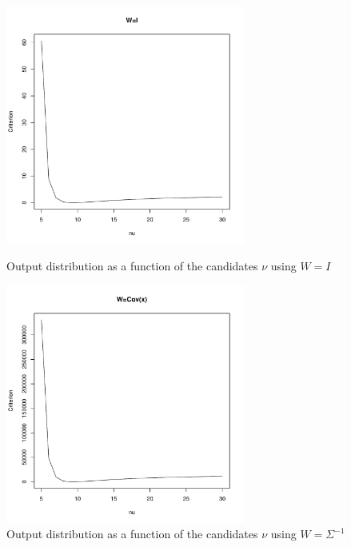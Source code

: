 \begin{figure}\label{t-returns_criterion}
    \centering
    \includegraphics[width=0.7\textwidth]{t-returns_criterion_(W=I).pdf}
    \caption{Output distribution as a function of the candidates $\nu$ using $W=I$}
    \includegraphics[width=0.7\textwidth]{t-returns_criterion_(W=Sigma^-1).pdf}
    \caption{Output distribution as a function of the candidates $\nu$ using $W=\Sigma^{-1}$}
\end{figure}


